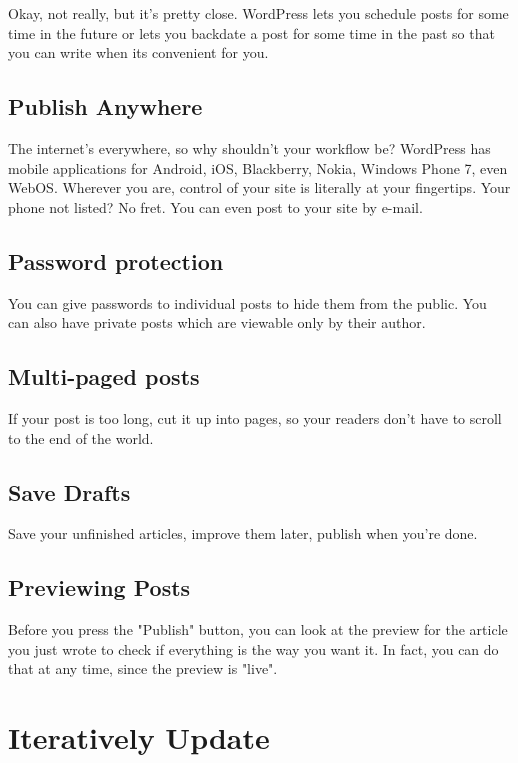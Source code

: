 Okay, not really, but it’s pretty close. WordPress lets you schedule posts for some time in the future or lets you backdate a post for some time in the past so that you can write when its convenient for you.

\subsection{Publish Anywhere}

The internet’s everywhere, so why shouldn’t your workflow be? WordPress has mobile applications for Android, iOS, Blackberry, Nokia, Windows Phone 7, even WebOS. Wherever you are, control of your site is literally at your fingertips. Your phone not listed? No fret. You can even post to your site by e-mail.

\subsection{Password protection}

You can give passwords to individual posts to hide them from the public. You can also have private posts which are viewable only by their author.

\subsection{Multi-paged posts}

If your post is too long, cut it up into pages, so your readers don't have to scroll to the end of the world.

\subsection{Save Drafts}

Save your unfinished articles, improve them later, publish when you're done.

\subsection{Previewing Posts}

Before you press the "Publish" button, you can look at the preview for the article you just wrote to check if everything is the way you want it. In fact, you can do that at any time, since the preview is "live".

\section{Iteratively Update}


